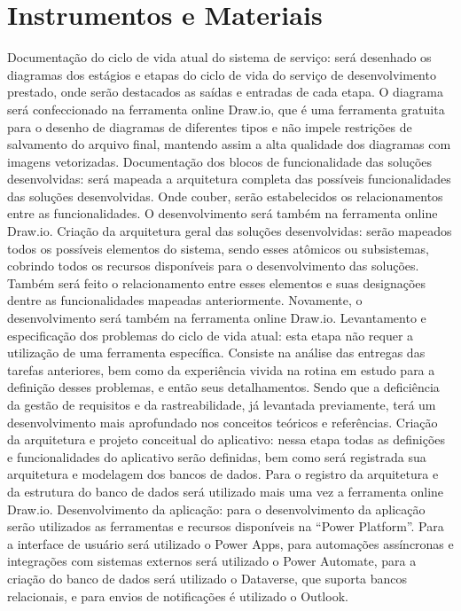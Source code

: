 	\section{Instrumentos e Materiais}
	Documentação do ciclo de vida atual do sistema de serviço: será desenhado 
	os diagramas dos estágios e etapas do ciclo de vida do serviço de 
	desenvolvimento prestado, onde serão destacados as saídas e entradas de 
	cada etapa. O diagrama será confeccionado na ferramenta online Draw.io, 
	que é uma ferramenta gratuita para o desenho de diagramas de diferentes 
	tipos e não impele restrições de salvamento do arquivo final, mantendo 
	assim a alta qualidade dos diagramas com imagens vetorizadas. 
	Documentação dos blocos de funcionalidade das soluções desenvolvidas: 
	será mapeada a arquitetura completa das possíveis funcionalidades das 
	soluções desenvolvidas. Onde couber, serão estabelecidos os 
	relacionamentos entre as funcionalidades. O desenvolvimento será também 
	na ferramenta online Draw.io. 
	Criação da arquitetura geral das soluções desenvolvidas: serão mapeados 
	todos os possíveis elementos do sistema, sendo esses atômicos ou 
	subsistemas, cobrindo todos os recursos disponíveis para o 
	desenvolvimento das soluções. Também será feito o relacionamento entre 
	esses elementos e suas designações dentre as funcionalidades mapeadas 
	anteriormente. Novamente, o desenvolvimento será também na ferramenta 
	online Draw.io. 
	Levantamento e especificação dos problemas do ciclo de vida atual: esta 
	etapa não requer a utilização de uma ferramenta específica. Consiste na 
	análise das entregas das tarefas anteriores, bem como da experiência vivida 
	na rotina em estudo para a definição desses problemas, e então seus 
	detalhamentos. Sendo que a deficiência da gestão de requisitos e da 
	rastreabilidade, já levantada previamente, terá um desenvolvimento mais 
	aprofundado nos conceitos teóricos e referências. 
	Criação da arquitetura e projeto conceitual do aplicativo: nessa etapa todas 
	as definições e funcionalidades do aplicativo serão definidas, bem como será 
	registrada sua arquitetura e modelagem dos bancos de dados. Para o 
	registro da arquitetura e da estrutura do banco de dados será utilizado mais 
	uma vez a ferramenta online Draw.io. 
	Desenvolvimento da aplicação: para o desenvolvimento da aplicação serão 
	utilizados as ferramentas e recursos disponíveis na “Power Platform”. Para 
	a interface de usuário será utilizado o Power Apps, para automações 
	assíncronas e integrações com sistemas externos será utilizado o Power 
	Automate, para a criação do banco de dados será utilizado o Dataverse, que 
	suporta bancos relacionais, e para envios de notificações é utilizado o 
	Outlook. 
